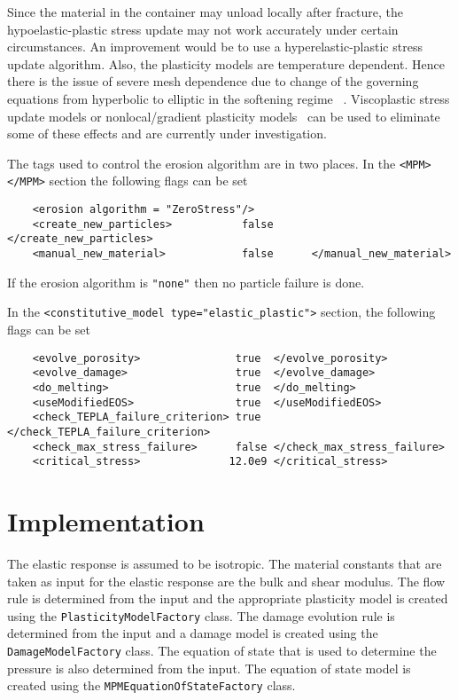   Since the material in the container may unload locally after fracture, the 
  hypoelastic-plastic stress update may not work accurately under certain 
  circumstances.  An improvement would be to use a hyperelastic-plastic stress 
  update algorithm.  Also, the plasticity models are temperature dependent.
  Hence there is the issue of severe mesh dependence due to change of the
  governing equations from hyperbolic to elliptic in the softening regime
  ~\cite{Hill1975,Bazant1985,Tver1990}.  Viscoplastic stress update models or 
  nonlocal/gradient plasticity models~\cite{Ramaswamy1998,Hao2000} can be used 
  to eliminate some of these effects and are currently under investigation. 

  The tags used to control the erosion algorithm are in two places.  
  In the \verb|<MPM> </MPM>| section the following flags can be set
  \lstset{language=XML}
  \begin{lstlisting}
    <erosion algorithm = "ZeroStress"/>
    <create_new_particles>           false      </create_new_particles>
    <manual_new_material>            false      </manual_new_material>
  \end{lstlisting}
  If the erosion algorithm is \verb|"none"| then no particle failure is done.

  In the \verb|<constitutive_model type="elastic_plastic">| section, the 
  following flags can be set
  \lstset{language=XML}
  \begin{lstlisting}
    <evolve_porosity>               true  </evolve_porosity>
    <evolve_damage>                 true  </evolve_damage>
    <do_melting>                    true  </do_melting>
    <useModifiedEOS>                true  </useModifiedEOS>
    <check_TEPLA_failure_criterion> true  </check_TEPLA_failure_criterion>
    <check_max_stress_failure>      false </check_max_stress_failure>
    <critical_stress>              12.0e9 </critical_stress>
  \end{lstlisting}

\section{Implementation}
The elastic response is assumed to be isotropic.  The material
constants that are taken as input for the elastic response are the
bulk and shear modulus.  The flow rule is determined from the input
and the appropriate plasticity model is created using the 
\verb+PlasticityModelFactory+ class.  The damage evolution rule
is determined from the input and a damage model is created using
the \verb+DamageModelFactory+ class.  The equation of state 
that is used to determine the pressure is also determined from the
input.  The equation of state model is created using the 
\verb+MPMEquationOfStateFactory+ class.


